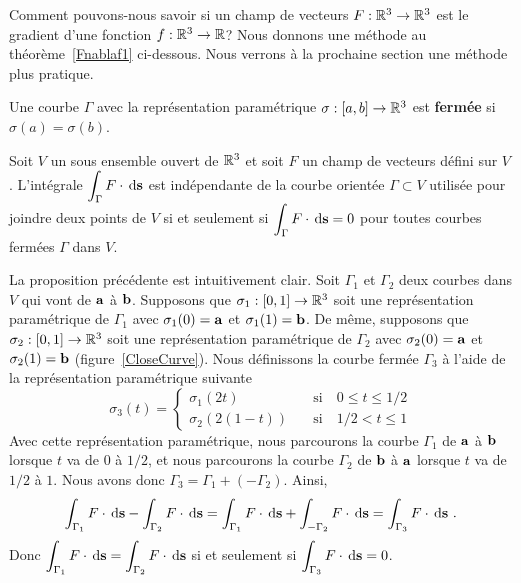 {Comment pouvons-nous savoir si un champ de vecteurs $F:\mathbb{R}^3 \to \mathbb{R}^3$ est
le gradient d'une fonction $f:\mathbb{R}^3 \to \mathbb{R}$?  Nous donnons une méthode au
théorème~\ref{Fnablaf1} ci-dessous.  Nous verrons à la prochaine section une
méthode plus pratique.

\begin{focus}{\dfn} 
Une courbe $\Gamma$ avec la représentation paramétrique
$\sigma:[a,b]\to \mathbb{R}^3$ est {\bfseries fermée} si $\sigma(a) = \sigma(b)$.
\end{focus}

\begin{focus}{\prp}
Soit $V$ un sous ensemble ouvert de $\mathbb{R}^3$ et soit $F$ un champ de
vecteurs défini sur $V$.  L'intégrale
$\displaystyle \int_\Gamma F \cdot \,\mathrm{d}\mathbf{s}$ est indépendante
de la courbe orientée $\Gamma \subset V$ utilisée pour joindre deux
points de $V$ si et seulement si
$\displaystyle \int_\Gamma F \cdot \,\mathrm{d}\mathbf{s} = 0$ pour toutes
courbes fermées $\Gamma$ dans $V$. 
\end{focus}

\begin{rmk}
La proposition précédente est intuitivement clair.  Soit $\Gamma_1$ et
$\Gamma_2$ deux courbes dans $V$ qui vont de $\mathbf{a}$ à $\mathbf{b}$.
Supposons que $\sigma_1:[0,1]\to \mathbb{R}^3$ soit une représentation
paramétrique de $\Gamma_1$ avec $\sigma_1(0) = \mathbf{a}$ et
$\sigma_1(1) = \mathbf{b}$.  De même, supposons que
$\sigma_2:[0,1]\to \mathbb{R}^3$ soit une représentation
paramétrique de $\Gamma_2$ avec $\sigma_2(0) = \mathbf{a}$ et
$\sigma_2(1) = \mathbf{b}$ (figure~\ref{CloseCurve}).
Nous définissons la courbe fermée $\Gamma_3$ à l'aide de la
représentation paramétrique suivante
\[
\sigma_3(t) = \begin{cases}
\sigma_1(2t) & \quad \text{si} \quad  0 \leq t \leq 1/2 \\
\sigma_2(2(1-t)) & \quad \text{si} \quad  1/2 < t \leq 1
\end{cases}
\]
Avec cette représentation paramétrique, nous parcourons la courbe
$\Gamma_1$ de $\mathbf{a}$ à $\mathbf{b}$ lorsque $t$ va de $0$ à $1/2$, et
nous parcourons la courbe $\Gamma_2$ de $\mathbf{b}$ à $\mathbf{a}$ lorsque $t$
va de $1/2$ à $1$.  Nous avons donc $\Gamma_3 = \Gamma_1 + (-\Gamma_2)$.
Ainsi,
\[
\int_{\Gamma_1} F \cdot \,\mathrm{d}\mathbf{s} -
\int_{\Gamma_2} F \cdot \,\mathrm{d}\mathbf{s}
= \int_{\Gamma_1} F \cdot \,\mathrm{d}\mathbf{s} + 
\int_{-\Gamma_2} F \cdot \,\mathrm{d}\mathbf{s}
= \int_{\Gamma_3} F \cdot \,\mathrm{d}\mathbf{s} \ .
\]
Donc $\displaystyle \int_{\Gamma_1} F \cdot \,\mathrm{d}\mathbf{s} =
\int_{\Gamma_2} F \cdot \,\mathrm{d}\mathbf{s}$ si et seulement si
$\displaystyle \int_{\Gamma_3} F \cdot \,\mathrm{d}\mathbf{s} = 0$.
\end{rmk}

}
